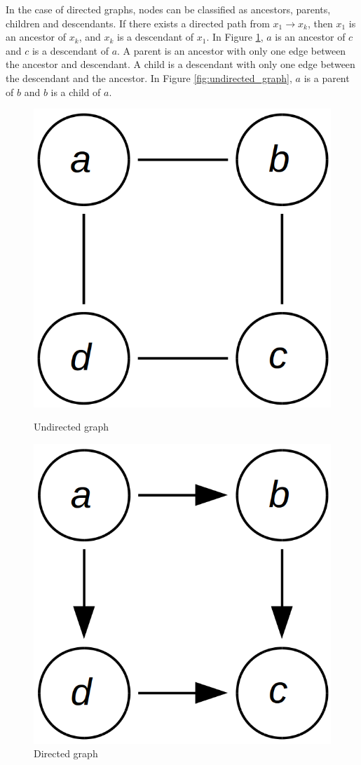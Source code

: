\documentclass[12pt,oneside,openany,a4paper, %
afrikaans,english,
]{memoir}
\numberwithin{equation}{chapter}
\begin{document}
{In the case of directed graphs, nodes can be classified as ancestors, parents, children and descendants. If there exists a directed path from $x_1 \to x_k$, then $x_1$ is an ancestor of $x_k$, and $x_k$ is a descendant of $x_1$. In Figure \ref{fig:directed_graph}, $a$ is an ancestor of $c$ and $c$ is a descendant of $a$. A parent is an ancestor with only one edge between the ancestor and descendant. A child is a descendant with only one edge between the descendant and the ancestor. In Figure \ref{fig:undirected_graph}, $a$ is a parent of $b$ and $b$ is a child of $a$.~\cite{barber}

\begin{figure}[htbp]
  \begin{minipage}[b]{0.5\linewidth}
    \centering
    \includegraphics[width=0.5\linewidth]{Figures/undirected_graph.png}
    \caption{Undirected graph}
    \label{fig:undirected_graph}
  \end{minipage}
  \hspace{0.5cm}
  \begin{minipage}[b]{0.5\linewidth}
    \centering
    \includegraphics[width=0.5\linewidth]{Figures/directed_graph.png}
    \caption{Directed graph}
    \label{fig:directed_graph}
  \end{minipage}
\end{figure}

}
\end{document}
